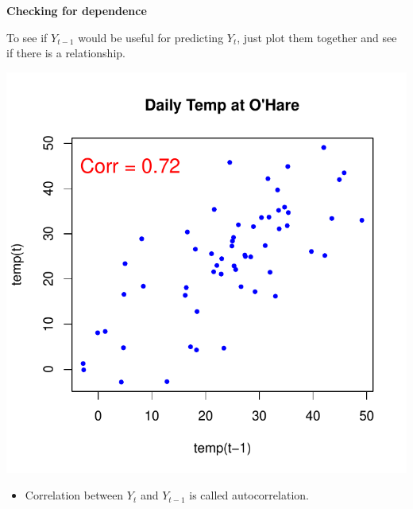 \documentclass[12pt,xcolor=svgnames]{beamer}
\newcommand{\rd}{\color{red}}
\newcommand{\theme}{\color{FireBrick}}
\newcommand{\sk}{\vspace{.4cm}}
\newcommand{\chap}[1]{{\theme \Large \bf #1} \sk}
\begin{document}
\begin{frame}
\chap{Checking for dependence}


To see if $Y_{t-1}$ would be useful for predicting $Y_t$, just plot them together
and see if there is a relationship.

\begin{center}
\begin{minipage}{6cm}
\includegraphics[scale=0.5,trim=20 30 0 25]{templast_new}
\end{minipage}
\begin{minipage}{3.75cm}
\begin{itemize}
\item Correlation between $Y_t$ and $Y_{t-1}$ is called {\rd autocorrelation}.
\end{itemize}
\end{minipage}
\end{center}

\vspace{-0.5cm}
\end{frame}
\end{document}
